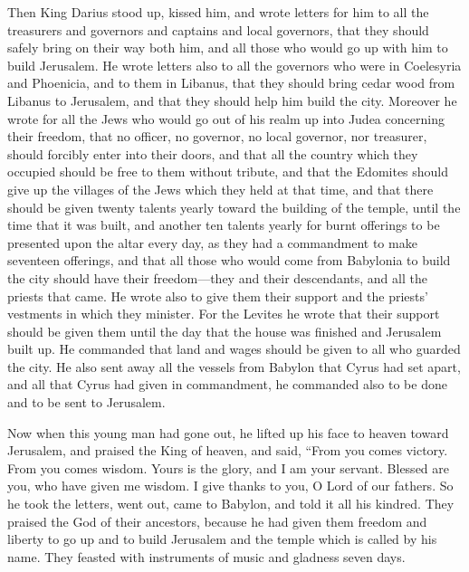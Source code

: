  Then King Darius stood up, kissed him, and wrote letters
for him to all the treasurers and governors and captains and local
governors, that they should safely bring on their way both him, and all
those who would go up with him to build Jerusalem.  He
wrote letters also to all the governors who were in Coelesyria and
Phoenicia, and to them in Libanus, that they should bring cedar wood
from Libanus to Jerusalem, and that they should help him build the city.
 Moreover he wrote for all the Jews who would go out of
his realm up into Judea concerning their freedom, that no officer, no
governor, no local governor, nor treasurer, should forcibly enter into
their doors,  and that all the country which they
occupied should be free to them without tribute, and that the Edomites
should give up the villages of the Jews which they held at that time,
 and that there should be given twenty talents yearly
toward the building of the temple, until the time that it was built,
 and another ten talents yearly for burnt offerings to be
presented upon the altar every day, as they had a commandment to make
seventeen offerings,  and that all those who would come
from Babylonia to build the city should have their freedom---they and
their descendants, and all the priests that came.  He
wrote also to give them their support and the priests' vestments in
which they minister.  For the Levites he wrote that their
support should be given them until the day that the house was finished
and Jerusalem built up.  He commanded that land and wages
should be given to all who guarded the city.  He also
sent away all the vessels from Babylon that Cyrus had set apart, and all
that Cyrus had given in commandment, he commanded also to be done and to
be sent to Jerusalem.

 Now when this young man had gone out, he lifted up his
face to heaven toward Jerusalem, and praised the King of heaven,
 and said, ``From you comes victory. From you comes
wisdom. Yours is the glory, and I am your servant. 
Blessed are you, who have given me wisdom. I give thanks to you, O Lord
of our fathers.  So he took the letters, went out, came
to Babylon, and told it all his kindred.  They praised
the God of their ancestors, because he had given them freedom and
liberty  to go up and to build Jerusalem and the temple
which is called by his name. They feasted with instruments of music and
gladness seven days.


